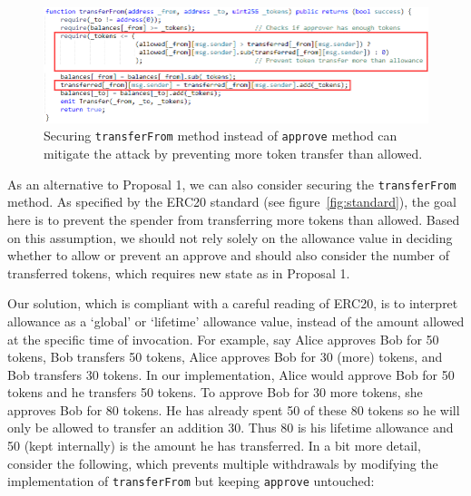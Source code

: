 \begin{figure}[t]
	\centering
	\includegraphics[width=1.0\linewidth]{figures/multiple_withdrawal_31.png}
	\caption{Securing \texttt{transferFrom} method instead of \texttt{approve} method can mitigate the attack by preventing more token transfer than allowed.\label{fig:transfer2}}
\end{figure}


As an alternative to Proposal 1, we can also consider securing the \texttt{transferFrom} method. As specified by the ERC20 standard (see figure~\ref{fig:standard}), the goal here is to prevent the spender from transferring more tokens than allowed. Based on this assumption, we should not rely solely on the allowance value in deciding whether to allow or prevent an approve and should also consider the number of transferred tokens, which requires new state as in Proposal 1. 

Our solution, which is compliant with a careful reading of ERC20, is to interpret allowance as a `global' or `lifetime' allowance value, instead of the amount allowed at the specific time of invocation. For example, say Alice approves Bob for 50 tokens, Bob transfers 50 tokens, Alice approves Bob for 30 (more) tokens, and Bob transfers 30 tokens. In our implementation, Alice would approve Bob for 50 tokens and he transfers 50 tokens. To approve Bob for 30 more tokens, she approves Bob for 80 tokens. He has already spent 50 of these 80 tokens so he will only be allowed to transfer an addition 30. Thus 80 is his lifetime allowance and 50 (kept internally) is the amount he has transferred. In a bit more detail, consider the following, which prevents multiple withdrawals by modifying the implementation of \texttt{transferFrom} but keeping \texttt{approve} untouched:


